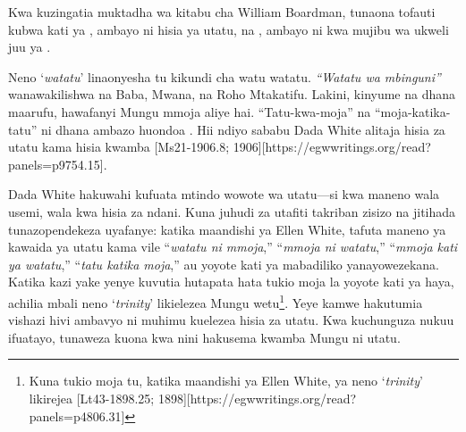 \begin{table}[H]
    \centering
    \renewcommand{\arraystretch}{1.5}
    \setlength{\tabcolsep}{15pt}
    \end{table}


Kwa kuzingatia muktadha wa kitabu cha William Boardman, tunaona tofauti kubwa kati ya , ambayo ni hisia ya utatu, na , ambayo ni kwa mujibu wa ukweli juu ya .


Neno ‘\textit{watatu}’ linaonyesha tu kikundi cha watu watatu. \textit{“Watatu wa mbinguni”} wanawakilishwa na Baba, Mwana, na Roho Mtakatifu. Lakini, kinyume na dhana maarufu, hawafanyi Mungu mmoja aliye hai. “Tatu-kwa-moja” na “moja-katika-tatu” ni dhana ambazo huondoa . Hii ndiyo sababu Dada White alitaja hisia za utatu kama hisia kwamba [Ms21-1906.8; 1906][https://egwwritings.org/read?panels=p9754.15].


Dada White hakuwahi kufuata mtindo wowote wa utatu—si kwa maneno wala usemi, wala kwa hisia za ndani. Kuna juhudi za utafiti takriban zisizo na jitihada tunazopendekeza uyafanye: katika maandishi ya Ellen White, tafuta maneno ya kawaida ya utatu kama vile “\textit{watatu ni mmoja},” “\textit{mmoja ni watatu},” “\textit{mmoja kati ya watatu},” “\textit{tatu katika moja},” au yoyote kati ya mabadiliko yanayowezekana. Katika kazi yake yenye kuvutia hutapata hata tukio moja la yoyote kati ya haya, achilia mbali neno ‘\textit{trinity}’ likielezea Mungu wetu\footnote{Kuna tukio moja tu, katika maandishi ya Ellen White, ya neno ‘\textit{trinity}’ likirejea [Lt43-1898.25; 1898][https://egwwritings.org/read?panels=p4806.31]}. Yeye kamwe hakutumia vishazi hivi ambavyo ni muhimu kuelezea hisia za utatu. Kwa kuchunguza nukuu ifuatayo, tunaweza kuona kwa nini hakusema kwamba Mungu ni utatu.


